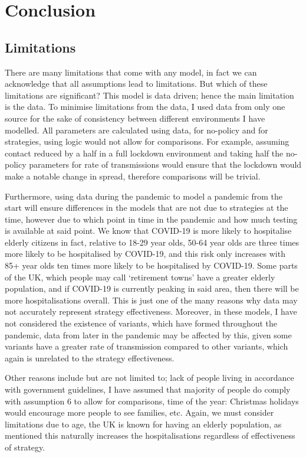 \documentclass[11pt]{article}
\begin{document}
\section{Conclusion}
\subsection{Limitations}
There are many limitations that come with any model, in fact we can acknowledge that all assumptions lead to limitations. But which of these limitations are significant? This model is data driven; hence the main limitation is the data. To minimise limitations from the data, I used data from only one source\citep{DataSource} for the sake of consistency between different environments I have modelled. All parameters are calculated using data, for no-policy and for strategies, using logic would not allow for comparisons. For example, assuming contact reduced by a half in a full lockdown environment and taking half the no-policy parameters for rate of transmissions would ensure that the lockdown would make a notable change in spread, therefore comparisons will be trivial. \par
Furthermore, using data during the pandemic to model a pandemic from the start will ensure differences in the models that are not due to strategies at the time, however due to which point in time in the pandemic and how much testing is available at said point. We know that COVID-19 is more likely to hospitalise elderly citizens in fact, relative to 18-29 year olds, 50-64 year olds are three times more likely to be hospitalised by COVID-19, and this risk only increases with 85+ year olds ten times more likely to be hospitalised by COVID-19\citep{AGE}. Some parts of the UK, which people may call ‘retirement towns’ have a greater elderly population, and if COVID-19 is currently peaking in said area, then there will be more hospitalisations overall. This is just one of the many reasons why data may not accurately represent strategy effectiveness. Moreover, in these models, I have not considered the existence of variants, which have formed throughout the pandemic, data from later in the pandemic may be affected by this, given some variants have a greater rate of transmission compared to other variants, which again is unrelated to the strategy effectiveness. \par
Other reasons include but are not limited to; lack of people living in accordance with government guidelines, I have assumed that majority of people do comply with assumption $6$ to allow for comparisons, time of the year: Christmas holidays would encourage more people to see families, etc. Again, we must consider limitations due to age, the UK is known for having an elderly population, as mentioned this naturally increases the hospitalisations regardless of effectiveness of strategy. \par
\end{document}

